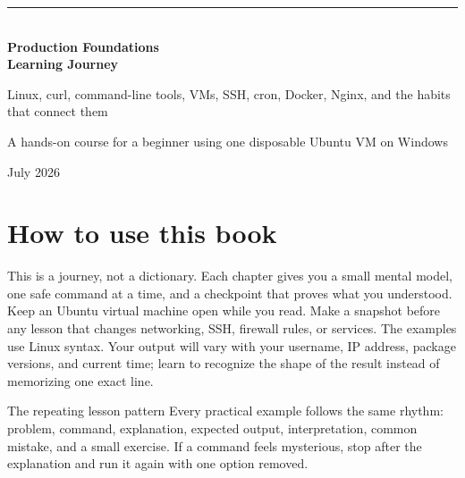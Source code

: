 \documentclass[11pt,a4paper,openany]{book}
\begin{document}
\begin{titlepage}
\thispagestyle{empty}
\vspace*{18mm}
{\color{teal}\rule{\textwidth}{2pt}}\\[15mm]
{\Huge\bfseries\color{ink}Production Foundations\\[4pt]Learning Journey}\par
\vspace{9mm}
{\Large\color{muted}Linux, curl, command-line tools, VMs, SSH, cron, Docker, Nginx, and the habits that connect them}\par
\vfill
{}
\vfill
\parbox{0.84\textwidth}{\centering\large A hands-on course for a beginner using one disposable Ubuntu VM on Windows}\par
\vspace{5mm}
{\color{muted}July 2026}\par
\end{titlepage}
\frontmatter
\chapter*{How to use this book}
This is a journey, not a dictionary. Each chapter gives you a small mental model, one safe command at a time, and a checkpoint that proves what you understood. Keep an Ubuntu virtual machine open while you read. Make a snapshot before any lesson that changes networking, SSH, firewall rules, or services.
The examples use Linux syntax. Your output will vary with your username, IP address, package versions, and current time; learn to recognize the shape of the result instead of memorizing one exact line.
\begin{mentalbox}{The repeating lesson pattern}
Every practical example follows the same rhythm: problem, command, explanation, expected output, interpretation, common mistake, and a small exercise. If a command feels mysterious, stop after the explanation and run it again with one option removed.
\end{mentalbox}
\end{document}

